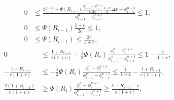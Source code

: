 \documentclass[../thesis.tex]{subfiles}
\begin{document}
\begin{equation}
    \begin{split}
        0
        &\leq
        \frac{\phi_{i-1}^{n+1}
        +\Psi(R_{i-1})\frac{\phi_{i-1}^{n} - \phi_{i-1}^{n+1}}{c~\Delta x}
        \frac{1+c}{2}\Delta x - \phi_{i-1}^{n+1}}
        {\phi_{i-1}^{n} - \phi_{i-1}^{n+1}}
        \leq
        1,
        \\
        0
        &\leq
        \Psi(R_{i-1})
        \frac{1+c}{2c}
        \leq
        1,
        \\
        0
        &\leq
        \Psi(R_{i-1})
        \leq
        \frac{2c}{1+c},
    \end{split}
\end{equation}
\begin{equation}
    \begin{split}
        0
        &\leq
        \frac{1 + R_{i-1}}
        {c(1+c)}
        -\frac{1}{2}
            \Psi(R_{i})
            \frac{\phi_{i}^{n} - \phi_{i}^{n+1}}
            {\phi_{i-1}^{n} - \phi_{i-1}^{n+1}}
        \leq
        1 - \frac{c}{1+c},
        \\
        -\frac{1 + R_{i-1}}{c(1+c)}
        &\leq
        -\frac{1}{2}
            \Psi(R_{i})
            \frac{\phi_{i}^{n} - \phi_{i}^{n+1}}
            {\phi_{i-1}^{n} - \phi_{i-1}^{n+1}}
        \leq
        \frac{1}{1+c} - \frac{1 + R_{i-1}}{c(1+c)},
        \\
        \frac{2\left( 1 + R_{i-1} \right)}{c(1+c)}
        &\geq
        \Psi(R_{i})
        \frac{\phi_{i}^{n} - \phi_{i}^{n+1}}
        {\phi_{i-1}^{n} - \phi_{i-1}^{n+1}}
        \geq
        \frac{1 + R_{i-1} - c}{c(1+c)},
    \end{split}
\end{equation}
\end{document}
